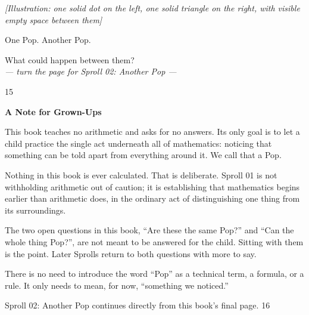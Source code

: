 \documentclass[12pt]{book}
\newcommand{\artnote}[1]{{\color{gray!70}\small\itshape [Illustration: #1]}\par\vspace{0.3in}}
\newcommand{\bigline}[1]{{\Huge #1}\par}
\newcommand{\pagenum}[1]{\vfill{\color{gray!50}\footnotesize #1}}
\newcommand{\sprollpage}{\newpage\vspace*{0.4in}}
\begin{document}
\sprollpage
\begin{center}
\vspace*{0.5in}
\artnote{one solid dot on the left, one solid triangle on the right, with visible empty space between them}
\vspace{0.4in}
\bigline{One Pop. Another Pop.}\vspace{0.3in}
{\Large What could happen between them?}
\vspace{0.5in}\\
{\small \textit{--- turn the page for Sproll 02: Another Pop ---}}
\end{center}
\pagenum{15}

\sprollpage
\vspace*{0.3in}
{\large \textbf{A Note for Grown-Ups}}
\vspace{0.2in}

\normalsize
This book teaches no arithmetic and asks for no answers. Its only goal is to let a child practice the single act underneath all of mathematics: noticing that something can be told apart from everything around it. We call that a Pop.

\vspace{0.15in}
Nothing in this book is ever calculated. That is deliberate. Sproll 01 is not withholding arithmetic out of caution; it is establishing that mathematics begins earlier than arithmetic does, in the ordinary act of distinguishing one thing from its surroundings.

\vspace{0.15in}
The two open questions in this book, ``Are these the same Pop?'' and ``Can the whole thing Pop?'', are not meant to be answered for the child. Sitting with them is the point. Later Sprolls return to both questions with more to say.

\vspace{0.15in}
There is no need to introduce the word ``Pop'' as a technical term, a formula, or a rule. It only needs to mean, for now, ``something we noticed.''

\vspace{0.3in}
{\small Sproll 02: Another Pop continues directly from this book's final page.}
\pagenum{16}
\end{document}
